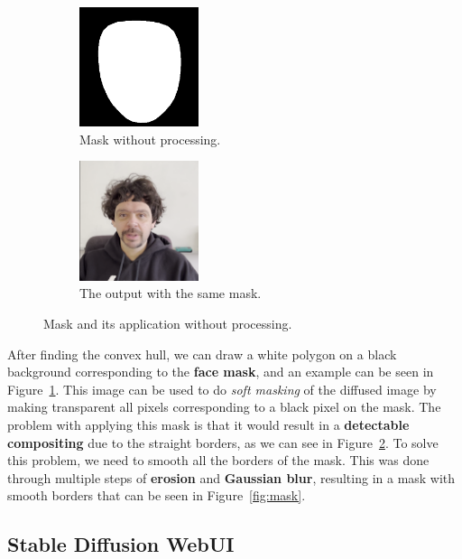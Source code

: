 \documentclass[preprint]{elsarticle}
\begin{document}
\begin{figure}[t]
	\centering
	\begin{subfigure}[b]{0.5\textwidth}
		\centering
		\includegraphics[width=3.5cm, keepaspectratio]{img/project_img/mask.png}
		\caption{Mask without processing.}\label{fig:mask-noblur}
	\end{subfigure}%
	\hfill
	\begin{subfigure}[b]{0.5\textwidth}
		\centering
		\includegraphics[width=3.5cm, keepaspectratio]{img/project_img/final-erorr.png}
		\caption{The output with the same mask.}\label{fig:mask-final-error}
	\end{subfigure}
	\caption{Mask and its application without processing.}\label{fig:eroor-mediapipe}
\end{figure}


After finding the convex hull, we can draw a white polygon on a black background corresponding to the \textbf{face mask}, 
and an example can be seen in Figure~\ref{fig:mask-noblur}. 
This image can be used to do \emph{soft masking} of the diffused image by making transparent all 
pixels corresponding to a black pixel on the mask. 
The problem with applying this mask is that it would result in a \textbf{detectable compositing} due to the straight borders, 
as we can see in Figure~\ref{fig:mask-final-error}. 
To solve this problem, we need to smooth all the borders of the mask. 
This was done through multiple steps of \textbf{erosion} and \textbf{Gaussian blur}, 
resulting in a mask with smooth borders that can be seen in Figure~\ref{fig:mask}.

\subsection{Stable Diffusion WebUI} \label{sec:stable_diffusion_webui}
\end{document}
